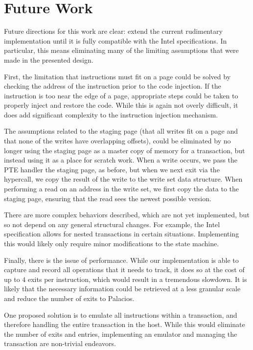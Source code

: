 \documentclass{acm_proc_article-sp}
\begin{document}
\section{Future Work}

Future directions for this work are clear: extend the current rudimentary 
implementation until it is fully compatible with the Intel specifications. In
particular, this means eliminating many of the limiting assumptions that were
made in the presented design.

First, the limitation that instructions must fit on a page could be solved by
checking the address of the instruction prior to the code injection. If the 
instruction is too near the edge of a page, appropriate steps could be taken
to properly inject and restore the code. While this is again not overly 
difficult, it does add significant complexity to the instruction injection
mechanism.

The assumptions related to the staging page (that all writes fit on a page
and that none of the writes have overlapping offsets), could be eliminated
by no longer using the staging page as a master copy of memory for a 
transaction, but instead using it as a place for scratch work. When a 
write occurs, we pass the PTE handler the staging page, as before, but when we 
next exit via the hypercall, we copy the result of the write to the write set
data structure. When performing a read on an address in the write set,
we first copy the data to the staging page, ensuring that the read sees the
newest possible version.

There are more complex behaviors described, which are not yet
implemented, but so not depend on any general structural changes. For example,
the Intel specification allows for nested transactions in certain situations.
Implementing this would likely only require minor modifications to the state
machine. 

Finally, there is the issue of performance. While our implementation is able 
to capture and record all operations that it needs to track, it does so at the
cost of up to $4$ exits per instruction, which would result in a tremendous
slowdown. It is likely that the necessary information could be retrieved at a 
less granular scale and reduce the number of exits to Palacios.

One proposed solution is to emulate all instructions within a transaction,
and therefore handling the entire transaction in the host. While this would
eliminate the number of exits and entries, implementing an emulator and managing
the transaction are non-trivial endeavors. 
  
\end{document}
